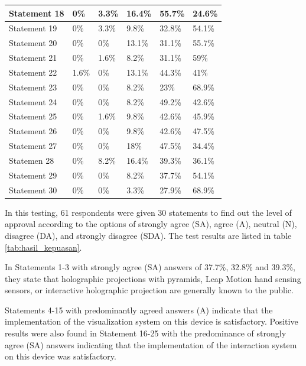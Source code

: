 \documentclass[conference]{IEEEtran}
\begin{document}
\begin{table}[h]
\begin{center}
\begin{tabular}{|l|C{0.7cm}|C{0.7cm}|C{0.7cm}|C{0.7cm}|C{0.7cm}|}
						Statement 18 & 0\%	 & 3.3\%  & 16.4\% & 55.7\% & 24.6\% \\ \hline
						Statement 19 & 0\%    & 3.3\%  & 9.8\%  & 32.8\% & 54.1\% \\ \hline
						Statement 20 & 0\%    & 0\% 	  & 13.1\% & 31.1\% & 55.7\% \\ \hline
						Statement 21 & 0\%    & 1.6\%  & 8.2\%  & 31.1\% & 59\%   \\ \hline
						Statement 22 & 1.6\%  & 0\%    & 13.1\% & 44.3\% & 41\%   \\ \hline
						Statement 23 & 0\%    & 0\%	  & 8.2\%  &  23\%  & 68.9\% \\ \hline
						Statement 24 & 0\%    & 0\%    & 8.2\%  & 49.2\% & 42.6\% \\ \hline
						Statement 25 & 0\%    & 1.6\%  & 9.8\%  & 42.6\% & 45.9\% \\ \hline
						Statement 26 & 0\%	 & 0\%    & 9.8\%  & 42.6\% & 47.5\% \\ \hline
						Statement 27 & 0\%    & 0\%    & 18\%   & 47.5\% & 34.4\% \\ \hline
						Statemen 28 & 0\%    & 8.2\%  & 16.4\% & 39.3\% & 36.1\% \\ \hline
						Statement 29 & 0\% 	 & 0\%    & 8.2\%  & 37.7\% & 54.1\% \\ \hline
						Statement 30 & 0\%	 & 0\%    & 3.3\%  & 27.9\% & 68.9\% \\ \hline
					\end{tabular}
				\end{center}
			\end{table}
			\vspace{-2ex}
			
			In this testing, 61 respondents were given 30 statements to find out the level of approval according to the options of strongly agree (SA), agree (A), neutral (N), disagree (DA), and strongly disagree (SDA). The test results are listed in table \ref{tab:hasil_kepuasan}.
			
			In Statements 1-3 with strongly agree (SA) answers of 37.7\%, 32.8\% and 39.3\%, they state that holographic projections with pyramids, Leap Motion hand sensing sensors, or interactive holographic projection are generally known to the public.
			
			Statements 4-15 with predominantly agreed answers (A) indicate that the implementation of the visualization system on this device is satisfactory. Positive results were also found in Statement 16-25 with the predominance of strongly agree (SA) answers indicating that the implementation of the interaction system on this device was satisfactory.
			
\end{document}
